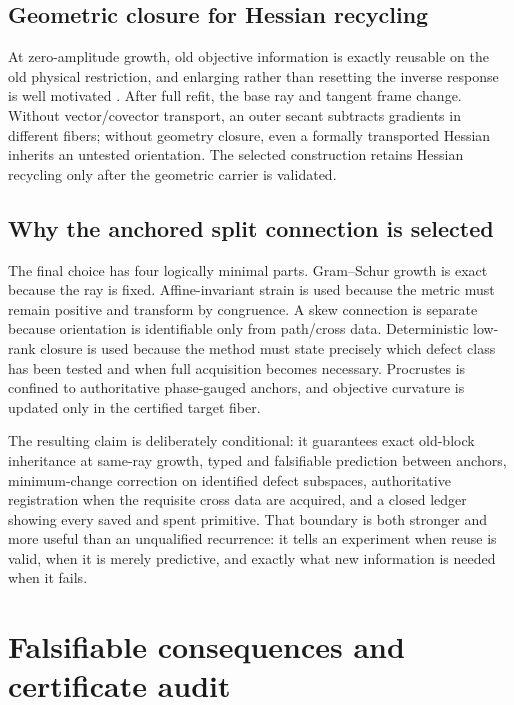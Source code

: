 \documentclass[10pt,twocolumn]{article}
\theoremstyle{definition}
\theoremstyle{remark}
\begin{document}
\subsection{Geometric closure for Hessian recycling}

At zero-amplitude growth, old objective information is exactly reusable on the
old physical restriction, and enlarging rather than resetting the inverse
response is well motivated \cite{Ramoa2025}.  After full refit, the base ray
and tangent frame change.  Without vector/covector transport, an outer secant
subtracts gradients in different fibers; without geometry closure, even a
formally transported Hessian inherits an untested orientation.  The selected
construction retains Hessian recycling only after the geometric carrier is
validated.

\subsection{Why the anchored split connection is selected}

The final choice has four logically minimal parts.  Gram--Schur growth is
exact because the ray is fixed.  Affine-invariant strain is used because the
metric must remain positive and transform by congruence.  A skew connection is
separate because orientation is identifiable only from path/cross data.
Deterministic low-rank closure is used because the method must state precisely
which defect class has been tested and when full acquisition becomes
necessary.  Procrustes is confined to authoritative phase-gauged anchors, and
objective curvature is updated only in the certified target fiber.

The resulting claim is deliberately conditional: it guarantees exact old-block
inheritance at same-ray growth, typed and falsifiable prediction between anchors,
minimum-change correction on identified defect subspaces, authoritative
registration when the requisite cross data are acquired, and a closed ledger
showing every saved and spent primitive.  That boundary is both stronger and
more useful than an unqualified recurrence: it tells an experiment when reuse
is valid, when it is merely predictive, and exactly what new information is
needed when it fails.

\section{Falsifiable consequences and certificate audit}
\label{app:audit}
\end{document}
